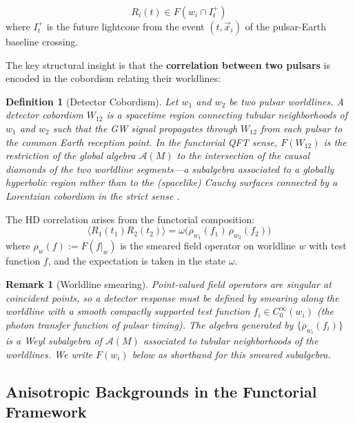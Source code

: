\documentclass[11pt,a4paper]{article}
\newtheorem{definition}{Definition}[section]
\newtheorem{remark}{Remark}[section]
\begin{document}
\begin{equation}
R_i(t) \in F(w_i \cap I_t^+)
\end{equation}
where $I_t^+$ is the future lightcone from the event $(t, \vec{x}_i)$ of the pulsar-Earth baseline crossing.

The key structural insight is that the \textbf{correlation between two pulsars} is encoded in the cobordism relating their worldlines:

\begin{definition}[Detector Cobordism]
Let $w_1$ and $w_2$ be two pulsar worldlines. A detector cobordism $W_{12}$ is a spacetime region connecting tubular neighborhoods of $w_1$ and $w_2$ such that the GW signal propagates through $W_{12}$ from each pulsar to the common Earth reception point. In the functorial QFT sense, $F(W_{12})$ is the restriction of the global algebra $\mathcal{A}(M)$ to the intersection of the causal diamonds of the two worldline segments---a subalgebra associated to a globally hyperbolic region rather than to the (spacelike) Cauchy surfaces connected by a Lorentzian cobordism in the strict sense \cite{Bunk:2025}.
\end{definition}

The HD correlation arises from the functorial composition:
\begin{equation}
\langle R_1(t_1) R_2(t_2) \rangle = \omega\bigl(\rho_{w_1}(f_1)\,\rho_{w_2}(f_2)\bigr)
\end{equation}
where $\rho_w(f) := F(f|_w)$ is the smeared field operator on worldline $w$ with test function $f$, and the expectation is taken in the state $\omega$.

\begin{remark}[Worldline smearing]\label{rem:smearing}
Point-valued field operators are singular at coincident points, so a detector response must be defined by smearing along the worldline with a smooth compactly supported test function $f_i \in C_0^\infty(w_i)$ (the photon transfer function of pulsar timing). The algebra generated by $\{\rho_{w_i}(f_i)\}$ is a Weyl subalgebra of $\mathcal{A}(M)$ associated to tubular neighborhoods of the worldlines. We write $F(w_i)$ below as shorthand for this smeared subalgebra.
\end{remark}

\subsection{Anisotropic Backgrounds in the Functorial Framework}\label{sec:anisotropic}
\end{document}
